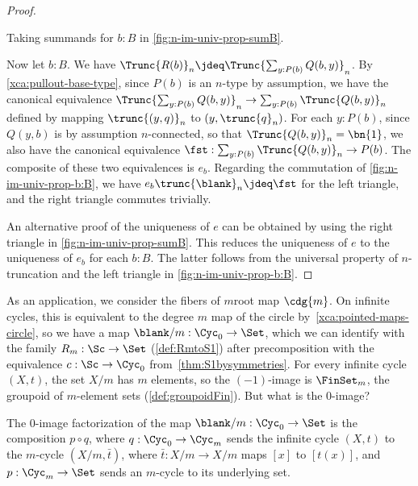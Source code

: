 \begin{proof}
\begin{marginfigure}
  \noindent{}
\caption{Taking summands for $b:B$ in \cref{fig:n-im-univ-prop-sumB}.}
\label{fig:n-im-univ-prop-b:B}
\end{marginfigure}

Now let $b:B$. We have $\Trunc{R(b)}_n \jdeq \Trunc{\sum_{y:P(b)} Q(b,y)}_n$.
By \cref{xca:pullout-base-type}, since $P(b)$ is an $n$-type by assumption,
we have the canonical equivalence
$\Trunc{\sum_{y:P(b)} Q(b,y)}_n\to\sum_{y:P(b)}\Trunc{Q(b,y)}_n$
defined by mapping $\trunc{(y,q)}_n$ to $(y,\trunc{q}_n)$.
For each $y:P(b)$, since $Q(y,b)$ is by assumption $n$-connected,
so that $\Trunc{Q(b,y)}_n = \bn{1}$,
we also have the canonical equivalence $\fst: \sum_{y:P(b)}\Trunc{Q(b,y)}_n \to P(b)$.
The composite of these two equivalences is $e_b$. Regarding the commutation
of \cref{fig:n-im-univ-prop-b:B}, we have $e_b \trunc{\blank}_n \jdeq \fst$
for the left triangle, and the right triangle commutes trivially.

An alternative proof of the uniqueness of $e$ can be obtained
by using the right triangle in \cref{fig:n-im-univ-prop-sumB}.
This reduces the uniqueness of $e$ to the uniqueness of $e_b$
for each $b:B$. The latter follows from the universal property
of $n$-truncation and the left triangle in \cref{fig:n-im-univ-prop-b:B}.
\end{proof}

As an application, we consider the fibers of $m$\th root map
$\cdg{m}$. On infinite cycles, this is equivalent to the degree $m$ map
of the circle by~\cref{xca:pointed-maps-circle}, so we have a map
$\blank/m : \Cyc_0 \to \Set$, which we can identify with the family
$R_m : \Sc \to \Set$ (\cref{def:RmtoS1})
after precomposition with the equivalence
$c : \Sc \to \Cyc_0$ from~\cref{thm:S1bysymmetries}.
For every infinite cycle $(X,t)$, the set $X/m$ has $m$ elements,
so the $(-1)$-image is $\FinSet_m$, the groupoid of $m$-element sets
(\cref{def:groupoidFin}).
But what is the $0$-image?

\begin{theorem}\label{thm:image-Z-to-Cm}
  The $0$-image factorization of the map $\blank/m : \Cyc_0 \to \Set$
  is the composition $p\circ q$, where $q : \Cyc_0 \to \Cyc_m$
  sends the infinite cycle $(X,t)$ to the $m$-cycle $(X/m,\bar t)$,
  where $\bar t : X/m \to X/m$ maps $[x]$ to $[t(x)]$,
  and $p:\Cyc_m\to\Set$ sends an $m$-cycle to its underlying set.
\end{theorem}

